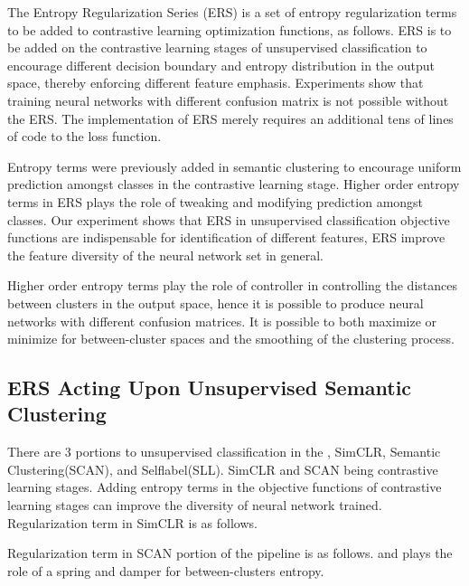\documentclass[10pt,twocolumn,letterpaper]{article}
\begin{document}
The Entropy Regularization Series (ERS) is a set of entropy regularization terms to be added to contrastive learning optimization functions, as follows. ERS is to be added on the contrastive learning stages of unsupervised classification to encourage different decision boundary and entropy distribution in the output space, thereby enforcing different feature emphasis. Experiments show that training neural networks with different confusion matrix is not possible without the ERS. The implementation of ERS merely requires an additional tens of lines of code to the loss function. 



Entropy terms were previously added in semantic clustering to encourage uniform prediction amongst classes in the contrastive learning stage. Higher order entropy terms in ERS plays the role of tweaking and modifying prediction amongst classes. Our experiment shows that ERS in unsupervised classification objective functions are indispensable for identification of different features, ERS improve the feature diversity of the neural network set in general.

 Higher order entropy terms play the role of controller in controlling the distances between clusters in the output space, hence it is possible to produce neural networks with different confusion matrices. It is possible to both maximize or minimize for between-cluster spaces and the smoothing of the clustering process. 

\subsection{ERS Acting Upon Unsupervised Semantic Clustering}

There are 3 portions to unsupervised classification in the \cite{wvangansbeke2020scan}, SimCLR, Semantic Clustering(SCAN), and Selflabel(SLL). SimCLR and SCAN being contrastive learning stages. Adding entropy terms in the objective functions of contrastive learning stages can improve the diversity of neural network trained. Regularization term in SimCLR is as follows.



Regularization term in SCAN portion of the pipeline is as follows.  and  plays the role of a spring and damper for between-clusters entropy.
\end{document}

